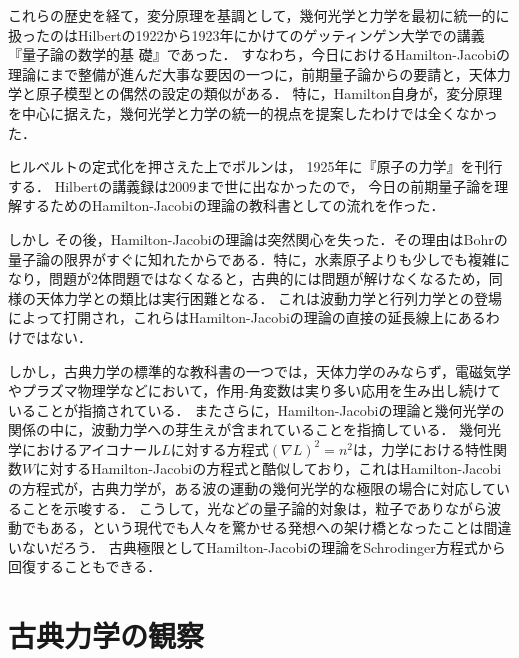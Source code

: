 \documentclass[uplatex,dvipdfmx]{jsreport}
\begin{document}
\begin{history}
    これらの歴史を経て，変分原理を基調として，幾何光学と力学を最初に統一的に扱ったのはHilbertの1922から1923年にかけてのゲッティンゲン大学での講義『量子論の数学的基
    礎』であった．
    すなわち，今日におけるHamilton-Jacobiの理論にまで整備が進んだ大事な要因の一つに，前期量子論からの要請と，天体力学と原子模型との偶然の設定の類似がある．
    特に，Hamilton自身が，変分原理を中心に据えた，幾何光学と力学の統一的視点を提案したわけでは全くなかった．
\end{history}

\begin{history}
    ヒルベルトの定式化を押さえた上でボルンは，
    1925年に『原子の力学』を刊行する．
    Hilbertの講義録は2009まで世に出なかったので，
    今日の前期量子論を理解するためのHamilton-Jacobiの理論の教科書としての流れを作った．

    しかし
    その後，Hamilton-Jacobiの理論は突然関心を失った．その理由はBohrの量子論の限界がすぐに知れたからである．特に，水素原子よりも少しでも複雑になり，問題が2体問題ではなくなると，古典的には問題が解けなくなるため，同様の天体力学との類比は実行困難となる．
    これは波動力学と行列力学との登場によって打開され，これらはHamilton-Jacobiの理論の直接の延長線上にあるわけではない．
\end{history}

\begin{history}[古典力学の再評価]
    しかし，古典力学の標準的な教科書の一つ\cite{Goldstein}では，天体力学のみならず，電磁気学やプラズマ物理学などにおいて，作用-角変数は実り多い応用を生み出し続けていることが指摘されている．
    またさらに，Hamilton-Jacobiの理論と幾何光学の関係の中に，波動力学への芽生えが含まれていることを指摘している．
    幾何光学におけるアイコナール$L$に対する方程式$(\nabla L)^2=n^2$は，力学における特性関数$W$に対するHamilton-Jacobiの方程式と酷似しており，これはHamilton-Jacobiの方程式が，古典力学が，ある波の運動の幾何光学的な極限の場合に対応していることを示唆する．
    こうして，光などの量子論的対象は，粒子でありながら波動でもある，という現代でも人々を驚かせる発想への架け橋となったことは間違いないだろう．
    古典極限としてHamilton-Jacobiの理論をSchrodinger方程式から回復することもできる．
\end{history}

\section{古典力学の観察}
\end{document}
